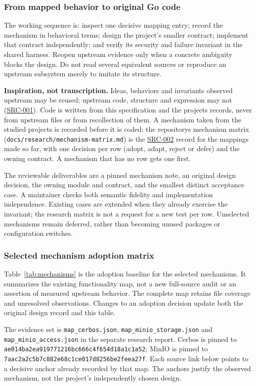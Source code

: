 \documentclass[11pt,a4paper]{article}
\newcommand{\code}[1]{{\small\nolinkurl{#1}}}
\newcommand{\rr}[1]{\hyperlink{req:#1}{#1}}
\begin{document}
\subsubsection{From mapped behavior to original Go code}
The working sequence is: inspect one decisive mapping entry; record the mechanism in behavioral terms; design the project's smaller contract; implement that contract independently; and verify its security and failure invariant in the shared harness. Reopen upstream evidence only when a concrete ambiguity blocks the design. Do not read several equivalent sources or reproduce an upstream subsystem merely to imitate its structure.

\textbf{Inspiration, not transcription.} Ideas, behaviors and invariants observed upstream may be reused; upstream code, structure and expression may not (\rr{SRC-001}). Code is written from this specification and the project\textquotesingle s records, never from upstream files or from recollection of them. A mechanism taken from the studied projects is recorded before it is coded: the repository\textquotesingle s mechanism matrix (\texttt{docs/research/mechanism-matrix.md}) is the \rr{SRC-002} record for the mappings made so far, with one decision per row (adopt, adapt, reject or defer) and the owning contract. A mechanism that has no row gets one first.

The reviewable deliverables are a pinned mechanism note, an original design decision, the owning module and contract, and the smallest distinct acceptance case. A maintainer checks both semantic fidelity and implementation independence. Existing cases are extended when they already exercise the invariant; the research matrix is not a request for a new test per row. Unselected mechanisms remain deferred, rather than becoming unused packages or configuration switches.

\subsubsection{Selected mechanism adoption matrix}
Table~\ref{tab:mechanisms} is the adoption baseline for the selected mechanisms. It summarizes the existing functionality map, not a new full-source audit or an assertion of measured upstream behavior. The complete map retains file coverage and unresolved observations. Changes to an adoption decision update both the original design record and this table.

The evidence set is \texttt{map\_cerbos.json}, \texttt{map\_minio\_storage.json} and \texttt{map\_minio\_access.json} in the separate research report. Cerbos is pinned to \code{ae014ba2ea919771216bc666c4f654d18a1c1a52}; MinIO is pinned to \code{7aac2a2c5b7c882e68c1ce017d8256be2feea27f}. Each source link below points to a decisive anchor already recorded by that map. The anchors justify the observed mechanism, not the project's independently chosen design.
\end{document}
